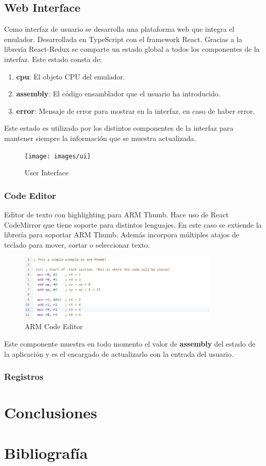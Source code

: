     \newpage
    \subsection{Web Interface}
    {
        Como interfaz de usuario se desarrolla una plataforma web que integra el emulador. Desarrollada en TypeScript con el framework React. Gracias a la librería React-Redux se comparte un estado global a todos los componentes de la interfaz. Este estado consta de:
        \begin{enumerate}
            \item \textbf{cpu}: El objeto CPU del emulador.
            \item \textbf{assembly}: El código ensamblador que el usuario ha introducido.
            \item \textbf{error}: Mensaje de error para mostrar en la interfaz, en caso de haber error.
        \end{enumerate}
        
        Este estado es utilizado por los distintos componentes de la interfaz para mantener siempre la información que se muestra actualizada.
        
        \begin{figure}[h]
         \centering
            \texttt{[image: images/ui]}
            \caption{User Interface}
        \end{figure}
        
        \subsubsection{Code Editor}
        {
            Editor de texto con highlighting para ARM Thumb. Hace uso de React CodeMirror que tiene soporte para distintos lenguajes. En este caso se extiende la librería para soportar ARM Thumb. Además incorpora múltiples atajos de teclado para mover, cortar o seleccionar texto.
            
            \begin{figure}[h]
                \centering
                \includegraphics[width=0.85\textwidth]{images/editor}
                \caption{ARM Code Editor}
            \end{figure}

            Este componente muestra en todo momento el valor de \textbf{assembly} del estado de la aplicación y es el encargado de actualizarlo con la entrada del usuario.
        }
        
        \subsubsection{Registros}
        {
        }
    }

\section{Conclusiones}
\section{Bibliografía}



